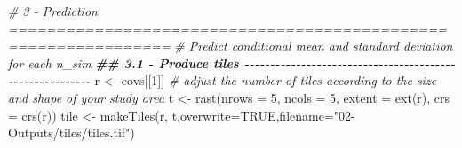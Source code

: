 \documentclass[
  10pt,
  b5paper,
  oneside]{book}
\newenvironment{Shaded}{\begin{snugshade}}{\end{snugshade}}
\newcommand{\AttributeTok}[1]{\textcolor[rgb]{0.77,0.63,0.00}{#1}}
\newcommand{\CommentTok}[1]{\textcolor[rgb]{0.56,0.35,0.01}{\textit{#1}}}
\newcommand{\ConstantTok}[1]{\textcolor[rgb]{0.00,0.00,0.00}{#1}}
\newcommand{\DecValTok}[1]{\textcolor[rgb]{0.00,0.00,0.81}{#1}}
\newcommand{\DocumentationTok}[1]{\textcolor[rgb]{0.56,0.35,0.01}{\textbf{\textit{#1}}}}
\newcommand{\FunctionTok}[1]{\textcolor[rgb]{0.00,0.00,0.00}{#1}}
\newcommand{\NormalTok}[1]{#1}
\newcommand{\OtherTok}[1]{\textcolor[rgb]{0.56,0.35,0.01}{#1}}
\newcommand{\StringTok}[1]{\textcolor[rgb]{0.31,0.60,0.02}{#1}}
\begin{document}
\begin{Shaded}
\begin{Highlighting}[]
\CommentTok{\# 3 {-} Prediction ===============================================================}
\CommentTok{\# Predict conditional mean and standard deviation for each n\_sim  }
\DocumentationTok{\#\# 3.1 {-} Produce tiles {-}{-}{-}{-}{-}{-}{-}{-}{-}{-}{-}{-}{-}{-}{-}{-}{-}{-}{-}{-}{-}{-}{-}{-}{-}{-}{-}{-}{-}{-}{-}{-}{-}{-}{-}{-}{-}{-}{-}{-}{-}{-}{-}{-}{-}{-}{-}{-}{-}{-}{-}{-}{-}{-}{-}{-}{-}}
\NormalTok{r }\OtherTok{\textless{}{-}}\NormalTok{ covs[[}\DecValTok{1}\NormalTok{]]}
\CommentTok{\# adjust the number of tiles according to the size and shape of your study area}
\NormalTok{t }\OtherTok{\textless{}{-}} \FunctionTok{rast}\NormalTok{(}\AttributeTok{nrows =} \DecValTok{5}\NormalTok{, }\AttributeTok{ncols =} \DecValTok{5}\NormalTok{, }\AttributeTok{extent =} \FunctionTok{ext}\NormalTok{(r), }\AttributeTok{crs =} \FunctionTok{crs}\NormalTok{(r))}
\NormalTok{tile }\OtherTok{\textless{}{-}} \FunctionTok{makeTiles}\NormalTok{(r, t,}\AttributeTok{overwrite=}\ConstantTok{TRUE}\NormalTok{,}\AttributeTok{filename=}\StringTok{"02{-}Outputs/tiles/tiles.tif"}\NormalTok{)}


\end{Highlighting}
\end{Shaded}
\end{document}
